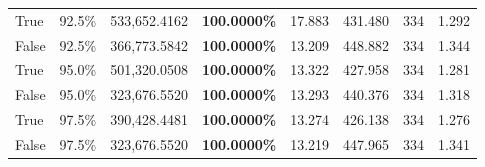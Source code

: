 \begin{table}[H]
\begin{tabular}{lllrllll}
\cline{1-8}
True & 92.5\% & 533,652.4162 & \bfseries \color{red} 100.0000\% & 17.883 & 431.480 & 334 & 1.292 \\
\cline{1-8}
False & 92.5\% & 366,773.5842 & \bfseries \color{red} 100.0000\% & 13.209 & 448.882 & 334 & 1.344 \\
\cline{1-8}
True & 95.0\% & 501,320.0508 & \bfseries \color{red} 100.0000\% & 13.322 & 427.958 & 334 & 1.281 \\
\cline{1-8}
False & 95.0\% & 323,676.5520 & \bfseries \color{red} 100.0000\% & 13.293 & 440.376 & 334 & 1.318 \\
\cline{1-8}
True & 97.5\% & 390,428.4481 & \bfseries \color{red} 100.0000\% & 13.274 & 426.138 & 334 & 1.276 \\
\cline{1-8}
False & 97.5\% & 323,676.5520 & \bfseries \color{red} 100.0000\% & 13.219 & 447.965 & 334 & 1.341 \\
\cline{1-8}
\bottomrule
\end{tabular}
\end{table}
